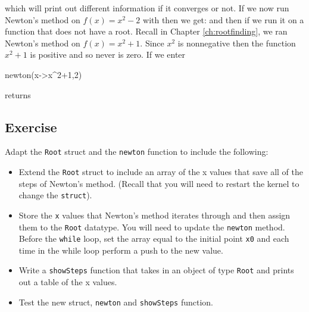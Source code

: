 %
which will print out different information if it converges or not.  If we now run Newton's method on $f(x)=x^2-2$ with  then we get:  \printpythontex[verbatim]
%
and then if we run it on a function that does not have a root. Recall in Chapter \ref{ch:rootfinding}, we ran Newton's method on $f(x)=x^2+1$.  Since $x^2$ is nonnegative then the function $x^2+1$ is positive and so never is zero.  If we enter
\begin{jlblock}[roots2]
newton(x->x^2+1,2)
\end{jlblock}
returns
 \printpythontex[verbatim]

\subsection{Exercise}

Adapt the \texttt{Root} struct and the \texttt{newton} function to include the following: 
\begin{itemize}
\item Extend the \texttt{Root} struct to include an array of the x values that save all of the steps of Newton's method.  (Recall that you will need to restart the kernel to change the \texttt{struct}). 
\item Store the \verb!x! values that Newton's method iterates through and then assign them to the \texttt{Root} datatype. You will need to update the \verb!newton! method.  Before the \texttt{while} loop, set the array equal to the initial point \verb!x0! and each time in the while loop perform a push to the new value. 
\item Write a \texttt{showSteps} function that takes in an object of type \texttt{Root} and prints out a table of the x values.  
\item Test the new struct, \verb!newton! and \verb!showSteps! function.  
\end{itemize}

